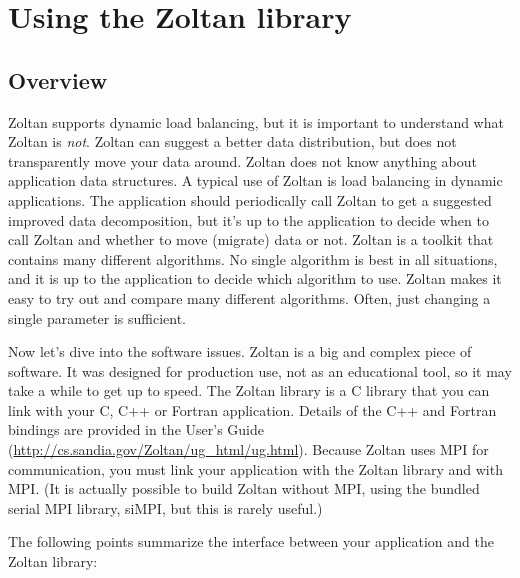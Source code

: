 %
% 
\chapter{Using the Zoltan library}
\label{cha:using}


\section{Overview}

Zoltan supports dynamic load balancing, but it is important 
to understand what Zoltan is \emph{not}. Zoltan can suggest
a better data distribution, but does not transparently move
your data around. Zoltan does not know anything about application
data structures. A typical use of Zoltan is 
load balancing in dynamic applications. The application
should periodically call Zoltan to get a suggested improved
data decomposition, but it's up to the application to
decide when to call Zoltan and whether to move (migrate) data or not.
Zoltan is a toolkit that contains many different algorithms.
No single algorithm is best in all situations, and it is
up to the application to decide which algorithm to use.
Zoltan makes it easy to try out and compare many different
algorithms. Often, just changing a single parameter is sufficient.

Now let's dive into the software issues. Zoltan is a big and complex 
piece of software. It was designed for production use, not as an educational 
tool, so it may take a while to get up to speed.
The Zoltan library is a C library that you can link with your C,
C++ or Fortran application.  Details of the C++ and Fortran bindings
are provided in the User's Guide 
(\url{http://cs.sandia.gov/Zoltan/ug_html/ug.html}).
Because Zoltan uses MPI for communication, you must link your application
with the Zoltan library and with MPI. (It is actually possible to build
Zoltan without MPI, using the bundled serial MPI library, siMPI,
but this is rarely useful.)

The following points summarize the interface between your
application and the Zoltan library:


